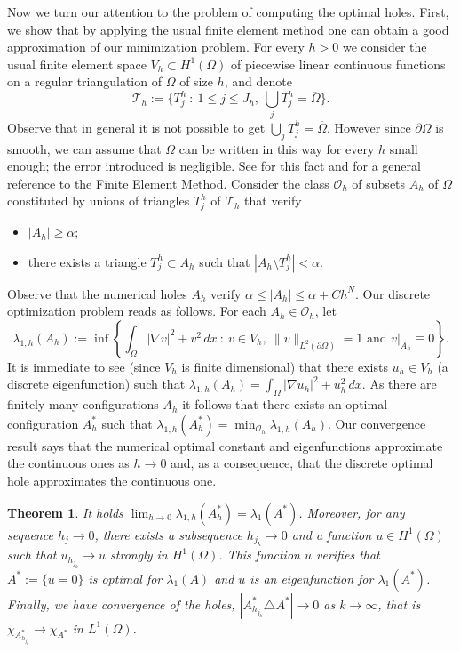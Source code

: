 \documentclass[11pt]{amsart}
\newtheorem{theorem}{Theorem}
\theoremstyle{remark}
\numberwithin{equation}{section}
\begin{document}
Now we turn our attention to the problem of computing the optimal holes. First, we show that by applying the usual finite element method one can obtain a good approximation of our minimization problem. For every $h>0$ we consider the usual finite element space $V_h\subset H^1(\Omega)$ of piecewise linear continuous functions on a regular triangulation of $\Omega$ of size $h$, and denote
\[
\mathcal{T}_h:=\Big\{T^h_j\ :\ 1\le j\le J_h,\ \bigcup_jT^h_j=\overline\Omega\Big\}.
\]
Observe that in general it is not possible to get $\bigcup_jT^h_j=\overline\Omega$. However since $\partial\Omega$ is smooth, we can assume that $\Omega$ can be written in this way for every $h$ small enough; the error introduced is negligible. See \cite{Ci} for this fact and for a general reference to the Finite Element Method. Consider the class $\mathcal{O}_h$ of subsets $A_h$ of $\Omega$ constituted by unions of triangles $T^h_j$ of $\mathcal{T}_h$ that verify
\begin{itemize}
\item $|A_h|\ge\alpha$;
\item there exists a triangle $T^h_j\subset A_h$ such that $|A_h\setminus T^h_j|<\alpha$.
\end{itemize}
Observe that the numerical holes $A_h$ verify $\alpha\le|A_h|\le\alpha+Ch^N$. Our discrete optimization problem reads as follows. For each $A_h\in\mathcal{O}_h$, let
\[
\lambda_{1,h}(A_h):=\inf\left\{\int_\Omega|\nabla v|^2+v^2\,dx\ :\ v\in V_h,\ \|v\|_{L^2(\partial\Omega)}=1\text{ and }v|_{A_h}\equiv0\right\}.
\]
It is immediate to see (since $V_h$ is finite dimensional) that there exists $u_h\in V_h$ (a discrete eigenfunction) such that $\lambda_{1,h}(A_h)=\int_\Omega|\nabla u_h|^2+u_h^2\,dx$. As there are finitely many configurations $A_h$ it follows that there exists an optimal configuration $A^*_h$ such that $\lambda_{1,h}(A^*_h)=\min_{\mathcal{O}_h}\lambda_{1,h}(A_h)$. Our convergence result says that the numerical optimal constant and eigenfunctions approximate the continuous ones as $h\to0$ and, as a consequence, that the discrete optimal hole approximates the continuous one.

\begin{theorem}\label{t.fem}
It holds $\lim_{h\to0}\lambda_{1,h}(A^*_h)=\lambda_1(A^*)$. Moreover, for any sequence $h_j\to0$, there exists a subsequence $h_{j_k}\to0$ and a function $u\in H^1(\Omega)$ such that $u_{h_{j_k}}\to u$ strongly in $H^1(\Omega)$. This function $u$ verifies that $A^*:=\{u=0\}$ is optimal for $\lambda_1(A)$ and $u$ is an eigenfunction for $\lambda_1(A^*)$. Finally, we have convergence of the holes, $|A^*_{h_{j_k}}\triangle A^*|\to0$ as $k\to\infty$, that is $\chi_{A^*_{h_{j_k}}}\to\chi_{A^*}$ in $L^1(\Omega)$.
\end{theorem}
\end{document}
